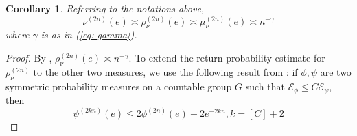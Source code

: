 \documentclass[pdflatex,sn-mathphys-num]{sn-jnl}%
\theoremstyle{thmstyleone}%
\theoremstyle{thmstyletwo}%
\theoremstyle{thmstylethree}%
\newtheorem{cor}{Corollary}%
\begin{document}
\begin{cor}
    \label{lem: return_prob} 
    Referring to the notations above, 
        $$\nu^{(2n)}(e) \asymp \rho_\nu^{(2n)}(e) \asymp \mu_\nu^{(2n)}(e) \asymp n^{-\gamma}$$
        where $\gamma$ is as in {\em (\ref{eq: gamma})}.
\end{cor}
\begin{proof}
By {\cite[Theorem 5.1]{SCZ-nil}}, $\rho_\nu^{(2n)}(e) \asymp  n^{-\gamma}$. To extend  the return probability estimate for $\rho_\nu^{(2n)}$ to the other two measures, we use the following result from  \cite{PSCstab}: 
    if $\phi, \psi$ are two symmetric probability measures on a countable group $G$ such that $\mathcal{E}_\phi \le C\mathcal{E}_\psi$, 
    then $$\psi^{(2kn)}(e) \le 2 \phi^{(2n)}(e) + 2e^{-2kn}, k = [C] + 2$$ 
\end{proof}
\end{document}
